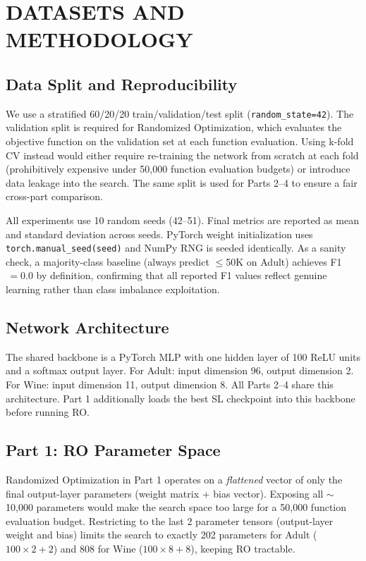 \documentclass[letterpaper, 10 pt, conference]{ieeeconf}
\begin{document}
\section{DATASETS AND METHODOLOGY}

\subsection{Data Split and Reproducibility}

We use a stratified 60/20/20 train/validation/test split (\texttt{random\_state=42}). The validation split is required for Randomized Optimization, which evaluates the objective function on the validation set at each function evaluation. Using k-fold CV instead would either require re-training the network from scratch at each fold (prohibitively expensive under 50{,}000 function evaluation budgets) or introduce data leakage into the search. The same split is used for Parts 2--4 to ensure a fair cross-part comparison.

All experiments use 10 random seeds (42--51). Final metrics are reported as mean and standard deviation across seeds. PyTorch weight initialization uses \texttt{torch.manual\_seed(seed)} and NumPy RNG is seeded identically. As a sanity check, a majority-class baseline (always predict $\leq$50K on Adult) achieves F1$\,=0.0$ by definition, confirming that all reported F1 values reflect genuine learning rather than class imbalance exploitation.

\subsection{Network Architecture}

The shared backbone is a PyTorch MLP with one hidden layer of 100 ReLU units and a softmax output layer. For Adult: input dimension 96, output dimension 2. For Wine: input dimension 11, output dimension 8. All Parts 2--4 share this architecture. Part 1 additionally loads the best SL checkpoint into this backbone before running RO.

\subsection{Part 1: RO Parameter Space}

Randomized Optimization in Part 1 operates on a \emph{flattened} vector of only the final output-layer parameters (weight matrix + bias vector). Exposing all $\sim$10{,}000 parameters would make the search space too large for a 50{,}000 function evaluation budget. Restricting to the last 2 parameter tensors (output-layer weight and bias) limits the search to exactly 202 parameters for Adult ($100\times2 + 2$) and 808 for Wine ($100\times8 + 8$), keeping RO tractable.
\end{document}
